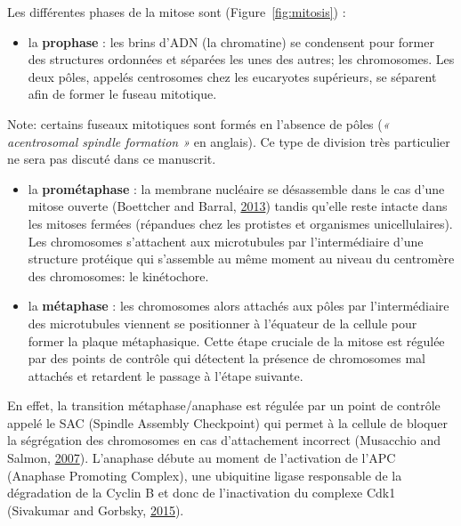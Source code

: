 \documentclass[12pt,a4paper,twoside,openright]{book}
\providecommand{\tightlist}{%
  \setlength{\itemsep}{0pt}\setlength{\parskip}{0pt}}
\begin{document}
Les différentes phases de la mitose sont (Figure~\ref{fig:mitosis}) :

\begin{itemize}
\tightlist
\item
  la \textbf{prophase} : les brins d'ADN (la chromatine) se condensent
  pour former des structures ordonnées et séparées les unes des autres;
  les chromosomes. Les deux pôles, appelés centrosomes chez les
  eucaryotes supérieurs, se séparent afin de former le fuseau mitotique.
\end{itemize}

Note: certains fuseaux mitotiques sont formés en l'absence de pôles
(\emph{« acentrosomal spindle formation »} en anglais). Ce type de
division très particulier ne sera pas discuté dans ce manuscrit.

\begin{itemize}
\item
  la \textbf{prométaphase} : la membrane nucléaire se désassemble dans
  le cas d'une mitose ouverte (Boettcher and Barral,
  \hyperref[ref-Boettcher2013]{2013}) tandis qu'elle reste intacte dans
  les mitoses fermées (répandues chez les protistes et organismes
  unicellulaires). Les chromosomes s'attachent aux microtubules par
  l'intermédiaire d'une structure protéique qui s'assemble au même
  moment au niveau du centromère des chromosomes: le kinétochore.
\item
  la \textbf{métaphase} : les chromosomes alors attachés aux pôles par
  l'intermédiaire des microtubules viennent se positionner à l'équateur
  de la cellule pour former la plaque métaphasique. Cette étape cruciale
  de la mitose est régulée par des points de contrôle qui détectent la
  présence de chromosomes mal attachés et retardent le passage à l'étape
  suivante.
\end{itemize}

En effet, la transition métaphase/anaphase est régulée par un point de
contrôle appelé le SAC (Spindle Assembly Checkpoint) qui permet à la
cellule de bloquer la ségrégation des chromosomes en cas d'attachement
incorrect (Musacchio and Salmon, \hyperref[ref-Musacchio2007]{2007}).
L'anaphase débute au moment de l'activation de l'APC (Anaphase Promoting
Complex), une ubiquitine ligase responsable de la dégradation de la
Cyclin B et donc de l'inactivation du complexe Cdk1 (Sivakumar and
Gorbsky, \hyperref[ref-Sivakumar2015]{2015}).
\end{document}
